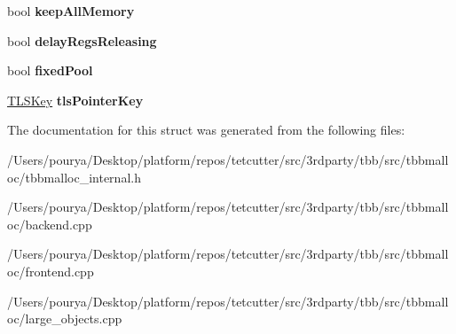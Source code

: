 \begin{DoxyCompactItemize}
\item 
\hypertarget{structrml_1_1internal_1_1ExtMemoryPool_a72cac70cd2102374a0ce820237c3d655}{}bool {\bfseries keep\+All\+Memory}\label{structrml_1_1internal_1_1ExtMemoryPool_a72cac70cd2102374a0ce820237c3d655}

\item 
\hypertarget{structrml_1_1internal_1_1ExtMemoryPool_a117b9e963f323eebb1742a3d5802fa65}{}bool {\bfseries delay\+Regs\+Releasing}\label{structrml_1_1internal_1_1ExtMemoryPool_a117b9e963f323eebb1742a3d5802fa65}

\item 
\hypertarget{structrml_1_1internal_1_1ExtMemoryPool_a978e0b112031bed60263674f71b7f5a5}{}bool {\bfseries fixed\+Pool}\label{structrml_1_1internal_1_1ExtMemoryPool_a978e0b112031bed60263674f71b7f5a5}

\item 
\hypertarget{structrml_1_1internal_1_1ExtMemoryPool_a8b3cd2c2364c73142c7eed261fa14be3}{}\hyperlink{classrml_1_1internal_1_1TLSKey}{T\+L\+S\+Key} {\bfseries tls\+Pointer\+Key}\label{structrml_1_1internal_1_1ExtMemoryPool_a8b3cd2c2364c73142c7eed261fa14be3}

\end{DoxyCompactItemize}


The documentation for this struct was generated from the following files\+:\begin{DoxyCompactItemize}
\item 
/\+Users/pourya/\+Desktop/platform/repos/tetcutter/src/3rdparty/tbb/src/tbbmalloc/tbbmalloc\+\_\+internal.\+h\item 
/\+Users/pourya/\+Desktop/platform/repos/tetcutter/src/3rdparty/tbb/src/tbbmalloc/backend.\+cpp\item 
/\+Users/pourya/\+Desktop/platform/repos/tetcutter/src/3rdparty/tbb/src/tbbmalloc/frontend.\+cpp\item 
/\+Users/pourya/\+Desktop/platform/repos/tetcutter/src/3rdparty/tbb/src/tbbmalloc/large\+\_\+objects.\+cpp\end{DoxyCompactItemize}
